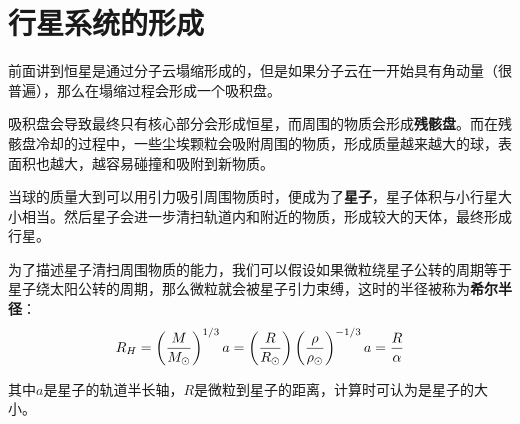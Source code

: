 \chapter{行星系统的形成}
前面讲到恒星是通过分子云塌缩形成的，但是如果分子云在一开始具有角动量（很普遍），那么在塌缩过程会形成一个吸积盘。

吸积盘会导致最终只有核心部分会形成恒星，而周围的物质会形成\textbf{残骸盘}。而在残骸盘冷却的过程中，一些尘埃颗粒会吸附周围的物质，形成质量越来越大的球，表面积也越大，越容易碰撞和吸附到新物质。

当球的质量大到可以用引力吸引周围物质时，便成为了\textbf{星子}，星子体积与小行星大小相当。然后星子会进一步清扫轨道内和附近的物质，形成较大的天体，最终形成行星。

为了描述星子清扫周围物质的能力，我们可以假设如果微粒绕星子公转的周期等于星子绕太阳公转的周期，那么微粒就会被星子引力束缚，这时的半径被称为\textbf{希尔半径}：
\begin{equation}
  R_H=\left({M\over M_\odot}\right)^{1/3}a=\left({R\over R_\odot}\right)\left({\rho \over \rho_\odot}\right)^{-1/3}a={R\over \alpha}
\end{equation}

其中$a$是星子的轨道半长轴，$R$是微粒到星子的距离，计算时可认为是星子的大小。

